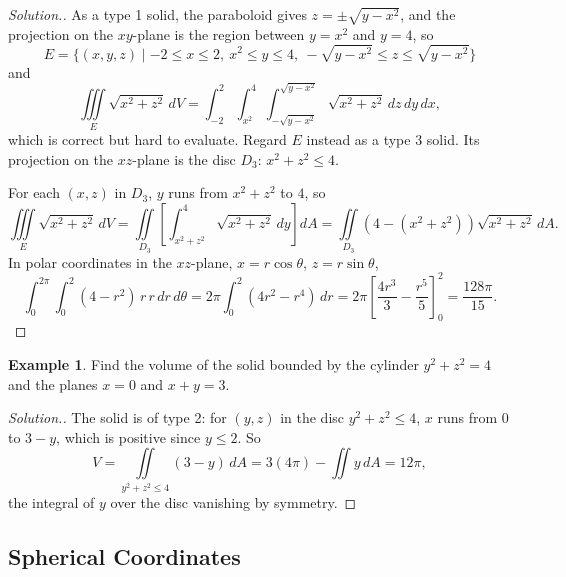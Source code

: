 \documentclass[11pt,a4paper]{article}
\theoremstyle{definition}
\newtheorem{exa}[thm]{Example}
\newenvironment{solution}
  {\renewcommand{\qedsymbol}{}\begin{proof}[\textit{Solution}.]}
  {\end{proof}}
\begin{document}
\begin{solution}
As a type 1 solid, the paraboloid gives $z = \pm \sqrt{y - x^2}$, and the
projection on the $xy$-plane is the region between $y = x^2$ and $y = 4$, so
\[E = \{ (x,y,z) \mid -2\leq x \leq 2,\ x^2 \leq y \leq 4,\ -\sqrt{y - x^2} \leq
z \leq \sqrt{y - x^2}\}\]
and
\[\iiint\limits_E \sqrt{x^2 + z^2}\,dV = \int^2_{-2}\int^4_{x^2}\int^{\sqrt{y -
x^2}}_{-\sqrt{y - x^2}}\sqrt{x^2 + z^2}\,dz\,dy\,dx ,\]
which is correct but hard to evaluate. Regard $E$ instead as a type 3 solid. Its
projection on the $xz$-plane is the disc $D_3$: $x^2 + z^2\leq 4$.

\begin{figure}[H]
\centering
{}
\end{figure}

For each $(x,z)$ in $D_3$, $y$ runs from $x^2 + z^2$ to $4$, so
\[\iiint\limits_E \sqrt{x^2 + z^2}\,dV = \iint\limits_{D_3} \left[
\int^4_{x^2 + z^2}\sqrt{x^2 + z^2}\, dy\right]dA = \iint\limits_{D_3}\left( 4
-(x^2 + z^2)\right) \sqrt{x^2 + z^2}\,dA .\]
In polar coordinates in the $xz$-plane, $x = r \cos \theta$, $z = r\sin
\theta$,
\[\int^{2\pi}_0 \int^2_0 (4-r^2)\,r\,r\,dr\,d\theta = 2\pi\int^2_0 (4r^2 -
r^4)\, dr = 2\pi \left[\frac{4r^3}{3}-\frac{r^5}{5}\right]^2_0 =
\frac{128\pi}{15} .\]
\end{solution}

\begin{exa}
\label{ex:triplecylinder}
Find the volume of the solid bounded by the cylinder $y^2 + z^2 = 4$ and the
planes $x = 0$ and $x + y = 3$.
\end{exa}

\begin{solution}
The solid is of type 2: for $(y,z)$ in the disc $y^2 + z^2\leq 4$, $x$ runs from
$0$ to $3 - y$, which is positive since $y\leq 2$. So
\[V = \iint\limits_{y^2+z^2\leq 4}(3 - y)\,dA = 3(4\pi) - \iint y\,dA = 12\pi ,\]
the integral of $y$ over the disc vanishing by symmetry.
\end{solution}

{\color[wave]{485}\subsection{Spherical Coordinates}}
\end{document}

